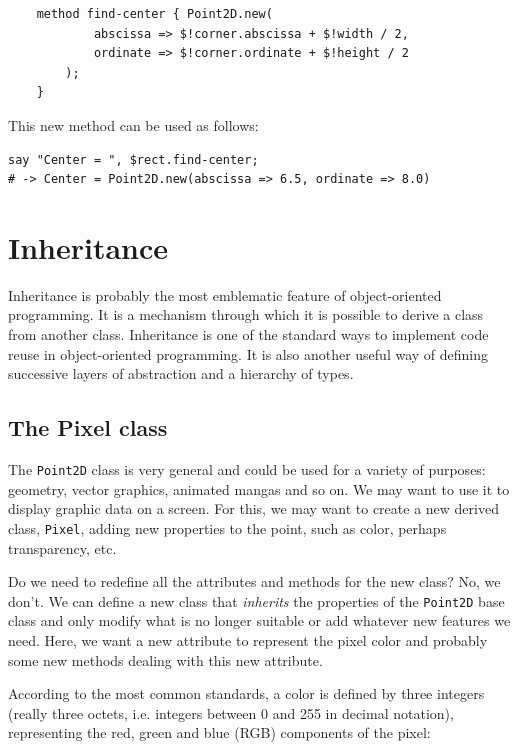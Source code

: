 \begin{verbatim}
    method find-center { Point2D.new(
            abscissa => $!corner.abscissa + $!width / 2, 
            ordinate => $!corner.ordinate + $!height / 2
        );
    }
\end{verbatim}
%
This new method can be used as follows:

\begin{verbatim}
say "Center = ", $rect.find-center;
# -> Center = Point2D.new(abscissa => 6.5, ordinate => 8.0)
\end{verbatim}
%

\section{Inheritance}


Inheritance is probably the most emblematic feature of 
object-oriented programming. It is a mechanism through which it 
is possible to derive a class from another class. Inheritance is 
one of the standard ways to implement code reuse in 
object-oriented programming. It is also another useful way of 
defining successive layers of abstraction and a hierarchy of 
types.

\subsection{The Pixel class}

The {\tt Point2D} class is very general and could be used for 
a variety of purposes: geometry, vector graphics, animated mangas 
and so on. We may want to use it to display graphic data on a 
screen. For this, we may want to create a new derived class, 
{\tt Pixel}, adding new properties to the point, such as color, 
perhaps transparency, etc. 

Do we need to redefine all the attributes and methods for 
the new class? No, we don't. We can define a new class that 
\emph{inherits} the properties of the {\tt Point2D} base class 
and only modify what is no longer suitable or add whatever 
new features we need. Here, we want a new attribute to represent 
the pixel color and probably some new methods dealing with this 
new attribute.

According to the most common standards, a color is defined 
by three integers (really three octets, i.e. integers 
between 0 and 255 in decimal notation), representing the red, 
green and blue (RGB) components of the pixel:

